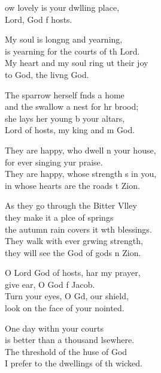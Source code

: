 \settowidth{\versewidth}{They are happy, whose strength is in you, *}
\begin{psalmverse}%
  \begin{patverse}
ow lovely is your dwlling place,\Med\\
Lord, God f hosts.

My soul is long\pointup{\i}ng and yearning,\Med\\
is yearning for the courts of th Lord.\\
My heart and my soul ring ut their joy\Med\\
to God, the liv\pointup{\i}ng God.

The sparrow herself f\pointup{\i}nds a home\Med\\
and the swallow a nest for hr brood;\\
she lays her young b your altars,\Med\\
Lord of hosts, my king and m God.

They are happy, who dwell \pointup{\i}n your house,\Med\\
for ever singing yur praise.\\
They are happy, whose strength \pointup{\i}s in you,\Med\\
in whose hearts are the roads t Zion.

As they go through the Bitter Vlley\Flex\\
they make it a plce of springs\Med\\
the autumn rain covers it w\pointup{\i}th blessings.\\
They walk with ever grwing strength,\Med\\
they will see the God of gods \pointup{\i}n Zion.

O Lord God of hosts, har my prayer,\Med\\
give ear, O God f Jacob.\\
Turn your eyes, O Gd, our shield,\Med\\
look on the face of your nointed.

One day with\pointup{\i}n your courts\Med\\
is better than a thousand lsewhere.\\
The threshold of the huse of God\Med\\
I prefer to the dwellings of th wicked.


\end{patverse}
\end{psalmverse}
